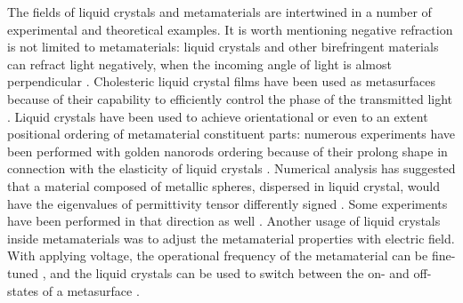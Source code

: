 \documentclass[a4paper,11pt]{article}
\begin{document}
The fields of liquid crystals and metamaterials are intertwined in a number of experimental and theoretical examples. 
It is worth mentioning negative refraction is not limited to metamaterials: liquid crystals and other birefringent materials can refract light negatively, when the incoming angle of light is almost perpendicular \cite{lavrentovich-2006-lc-neg}.
Cholesteric liquid crystal films have been used as metasurfaces because of their capability to efficiently control the phase of the transmitted light \cite{ozaki-2016-patterned-lc}.
Liquid crystals have been used to achieve orientational or even to an extent positional ordering of metamaterial constituent parts: numerous experiments have been performed with golden nanorods ordering because of their prolong shape in connection with the elasticity of liquid crystals \cite{lavrentovich-2008-gold-nanorods,smalyukh-2010-self-alignment,lavrentovich-2009-nanorods}. 
Numerical analysis has suggested that a material composed of metallic spheres, dispersed in liquid crystal, would have the eigenvalues of permittivity tensor differently signed \cite{xuan-2013-nanoparticle-lc,khoo-2014-nanoparticle-lc}. 
Some experiments have been performed in that direction as well \cite{ponsinet-2016-lc-assembly,goodby-2011-lc-gold-mtm}. 
% 
% 
% 
% 
Another usage of liquid crystals inside metamaterials was to adjust the metamaterial properties with electric field. 
With applying voltage, the operational frequency of the metamaterial can be fine-tuned \cite{zhang-2007-lc-mtm-tuning,shalaev-2007-tunable-lc}, and the liquid crystals can be used to switch between the on- and off-states of a metasurface \cite{buchnev-2015-lc-mtm-switch}. 
\end{document}

